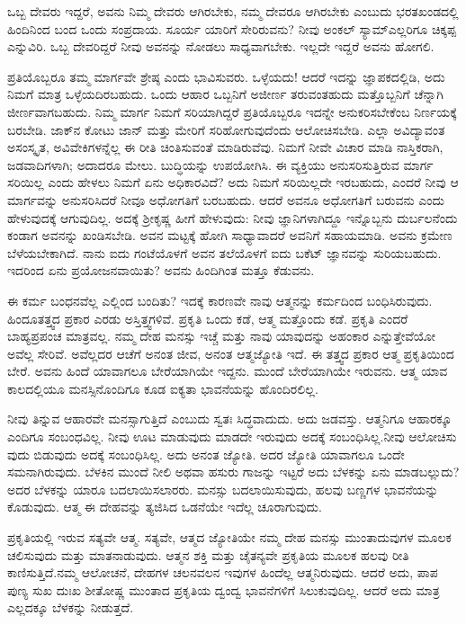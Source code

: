 ಒಬ್ಬ ದೇವರು ಇದ್ದರೆ, ಅವನು ನಿಮ್ಮ ದೇವರು ಆಗಿರಬೇಕು, ನಮ್ಮ ದೇವರೂ ಆಗಿರಬೇಕು ಎಂಬುದು ಭರತಖಂಡದಲ್ಲಿ ಹಿಂದಿನಿಂದ ಬಂದ ಒಂದು ಸಂಪ್ರದಾಯ. ಸೂರ್ಯ ಯಾರಿಗೆ ಸೇರಿರುವನು? ನೀವು ಅಂಕಲ್​ ಸ್ಯಾಮ್​ ಎಲ್ಲರಿಗೂ ಚಿಕ್ಕಪ್ಪ ಎನ್ನುವಿರಿ. ಒಬ್ಬ ದೇವರಿದ್ದರೆ ನೀವು ಅವನನ್ನು ನೋಡಲು ಸಾಧ್ಯವಾಗಬೇಕು. ಇಲ್ಲದೇ ಇದ್ದರೆ ಅವನು ಹೋಗಲಿ.

ಪ್ರತಿಯೊಬ್ಬರೂ ತಮ್ಮ ಮಾರ್ಗವೇ ಶ್ರೇಷ್ಠ ಎಂದು ಭಾವಿಸುವರು. ಒಳ್ಳೆಯದು! ಆದರೆ ಇದನ್ನು ಜ್ಞಾಪಕದಲ್ಲಿಡಿ, ಅದು ನಿಮಗೆ ಮಾತ್ರ ಒಳ್ಳೆಯದಿರಬಹುದು. ಒಂದು ಆಹಾರ ಒಬ್ಬನಿಗೆ ಅಜೀರ್ಣ ತರುವಂತಹುದು ಮತ್ತೊಬ್ಬನಿಗೆ ಚೆನ್ನಾಗಿ ಜೀರ್ಣವಾಗಬಹುದು. ನಿಮ್ಮ ಮಾರ್ಗ ನಿಮಗೆ ಸರಿಯಾಗಿದ್ದರೆ ಪ್ರತಿಯೊಬ್ಬರೂ ಇದನ್ನೇ ಅನುಕರಿಸಬೇಕೆಂಬ ನಿರ್ಣಯಕ್ಕೆ ಬರಬೇಡಿ. ಜಾಕ್​ನ ಕೋಟು ಜಾನ್​ ಮತ್ತು ಮೇರಿಗೆ ಸರಿಹೋಗುವುದೆಂದು ಆಲೋಚಿಸಬೇಡಿ. ಎಲ್ಲಾ ಅವಿದ್ಯಾವಂತ ಅಸಂಸ್ಕೃತ, ಅವಿವೇಕಿಗಳನ್ನೆಲ್ಲ ಈ ರೀತಿ ಚಿಂತಿಸುವಂತೆ ಮಾಡಿರುವೆವು. ನಿಮಗೆ ನೀವೇ ವಿಚಾರ ಮಾಡಿ ನಾಸ್ತಿಕರಾಗಿ, ಜಡವಾದಿಗಳಾಗಿ; ಅದಾದರೂ ಮೇಲು. ಬುದ್ಧಿಯನ್ನು ಉಪಯೋಗಿಸಿ. ಈ ವ್ಯಕ್ತಿಯು ಅನುಸರಿಸುತ್ತಿರುವ ಮಾರ್ಗ ಸರಿಯಿಲ್ಲ ಎಂದು ಹೇಳಲು ನಿಮಗೆ ಏನು ಅಧಿಕಾರವಿದೆ? ಅದು ನಿಮಗೆ ಸರಿಯಿಲ್ಲದೇ ಇರಬಹುದು, ಎಂದರೆ ನೀವು ಆ ಮಾರ್ಗವನ್ನು ಅನುಸರಿಸಿದರೆ ನೀವೂ ಅಧೋಗತಿಗೆ ಬರಬಹುದು. ಆದರೆ ಅವನೂ ಅಧೋಗತಿಗೆ ಬರುವನು ಎಂದು ಹೇಳುವುದಕ್ಕೆ ಆಗುವುದಿಲ್ಲ. ಅದಕ್ಕೆ ಶ‍್ರೀಕೃಷ್ಣ ಹೀಗೆ ಹೇಳುವುದು: ನೀವು ಜ್ಞಾನಿಗಳಾಗಿದ್ದೂ ಇನ್ನೊಬ್ಬನು ದುರ್ಬಲನೆಂದು ಕಂಡಾಗ ಅವನನ್ನು ಖಂಡಿಸಬೇಡಿ. ಅವನ ಮಟ್ಟಕ್ಕೆ ಹೋಗಿ ಸಾಧ್ಯಾವಾದರೆ ಅವನಿಗೆ ಸಹಾಯಮಾಡಿ. ಅವನು ಕ್ರಮೇಣ ಬೆಳೆಯಬೇಕಾಗಿದೆ. ನಾನು ಐದು ಗಂಟೆಯೊಳಗೆ ಅವನ ತಲೆಯೊಳಗೆ ಐದು ಬಕೆಟ್​ ಜ್ಞಾನವನ್ನು ಸುರಿಯಬಹುದು. ಇದರಿಂದ ಏನು ಪ್ರಯೋಜನವಾಯಿತು? ಅವನು ಹಿಂದಿಗಿಂತ ಮತ್ತೂ ಕೆಡುವನು.

ಈ ಕರ್ಮ ಬಂಧನವೆಲ್ಲ ಎಲ್ಲಿಂದ ಬಂದಿತು? ಇದಕ್ಕೆ ಕಾರಣವೇ ನಾವು ಆತ್ಮನನ್ನು ಕರ್ಮದಿಂದ ಬಂಧಿಸಿರುವುದು. ಹಿಂದೂತತ್ತ್ವದ ಪ್ರಕಾರ ಎರಡು ಅಸ್ತಿತ್ತ್ವಗಳಿವೆ. ಪ್ರಕೃತಿ ಒಂದು ಕಡೆ, ಆತ್ಮ ಮತ್ತೊಂದು ಕಡೆ. ಪ್ರಕೃತಿ ಎಂದರೆ ಬಾಹ್ಯಪ್ರಪಂಚ ಮಾತ್ರವಲ್ಲ. ನಮ್ಮ ದೇಹ ಮನಸ್ಸು ಇಚ್ಚೆ ಮತ್ತು ನಾವು ಯಾವುದನ್ನು ಅಹಂಕಾರ ಎನ್ನುತ್ತೇವೆಯೋ ಅವೆಲ್ಲ ಸೇರಿವೆ. ಅವೆಲ್ಲದರ ಆಚೆಗೆ ಅನಂತ ಜೀವ, ಅನಂತ ಆತ್ಮಜ್ಯೋತಿ ಇದೆ. ಈ ತತ್ತ್ವದ ಪ್ರಕಾರ ಆತ್ಮ ಪ್ರಕೃತಿಯಿಂದ ಬೇರೆ. ಅವನು ಹಿಂದೆ ಯಾವಾಗಲೂ ಬೇರೆಯಾಗಿಯೇ ಇದ್ದನು. ಮುಂದೆ ಬೇರೆಯಾಗಿಯೇ ಇರುವನು. ಆತ್ಮ ಯಾವ ಕಾಲದಲ್ಲಿಯೂ ಮನಸ್ಸಿನೊಂದಿಗೂ ಕೂಡ ಐಕ್ಯತಾ ಭಾವನೆಯನ್ನು ಹೊಂದಿರಲಿಲ್ಲ.

ನೀವು ತಿನ್ನುವ ಆಹಾರವೇ ಮನಸ್ಸಾಗುತ್ತಿದೆ ಎಂಬುದು ಸ್ವತಃ ಸಿದ್ಧವಾದುದು. ಅದು ಜಡವಸ್ತು. ಆತ್ಮನಿಗೂ ಆಹಾರಕ್ಕೂ ಎಂದಿಗೂ ಸಂಬಂಧವಿಲ್ಲ. ನೀವು ಊಟ ಮಾಡುವುದು ಮಾಡದೇ ಇರುವುದು ಅದಕ್ಕೆ ಸಂಬಂಧಿಸಿಲ್ಲ.ನೀವು ಆಲೋಚಿಸು ವುದು ಬಿಡುವುದು ಅದಕ್ಕೆ ಸಂಬಂಧಿಸಿಲ್ಲ. ಅದು ಅನಂತ ಜ್ಯೋತಿ. ಅದರ ಜ್ಯೋತಿ ಯಾವಾಗಲೂ ಒಂದೇ ಸಮನಾಗಿರುವುದು. ಬೆಳಕಿನ ಮುಂದೆ ನೀಲಿ ಅಥವಾ ಹಸುರು ಗಾಜನ್ನು ಇಟ್ಟರೆ ಅದು ಬೆಳಕನ್ನು ಏನು ಮಾಡಬಲ್ಲುದು? ಅದರ ಬೆಳಕನ್ನು ಯಾರೂ ಬದಲಾಯಿಸಲಾರರು. ಮನಸ್ಸು ಬದಲಾಯಿಸುವುದು, ಹಲವು ಬಣ್ಣಗಳ ಭಾವನೆಯನ್ನು ಕೊಡುವುದು. ಆತ್ಮ ಈ ದೇಹವನ್ನು ತ್ಯಜಿಸಿದ ಒಡನೆಯೇ ಇದೆಲ್ಲ ಚೂರಾಗುವುದು.

ಪ್ರಕೃತಿಯಲ್ಲಿ ಇರುವ ಸತ್ಯವೇ ಆತ್ಮ. ಸತ್ಯವೇ, ಆತ್ಮದ ಜ್ಯೋತಿಯೇ ನಮ್ಮ ದೇಹ ಮನಸ್ಸು ಮುಂತಾದುವುಗಳ ಮೂಲಕ ಚಲಿಸುವುದು ಮತ್ತು ಮಾತನಾಡುವುದು. ಆತ್ಮನ ಶಕ್ತಿ ಮತ್ತು ಚೈತನ್ಯವೇ ಪ್ರಕೃತಿಯ ಮೂಲಕ ಹಲವು ರೀತಿ ಕಾಣಿಸುತ್ತಿದೆ.ನಮ್ಮ ಆಲೋಚನೆ, ದೇಹಗಳ ಚಲನವಲನ ಇವುಗಳ ಹಿಂದೆಲ್ಲ ಆತ್ಮನಿರುವುದು. ಆದರೆ ಅದು, ಪಾಪ ಪುಣ್ಯ ಸುಖ ದುಃಖ ಶೀತೋಷ್ಣ ಮುಂತಾದ ಪ್ರಕೃತಿಯ ದ್ವಂದ್ವ ಭಾವನೆಗಳಿಗೆ ಸಿಲುಕುವುದಿಲ್ಲ. ಆದರೆ ಅದು ಮಾತ್ರ ಎಲ್ಲದಕ್ಕೂ ಬೆಳಕನ್ನು ನೀಡುತ್ತದೆ.

